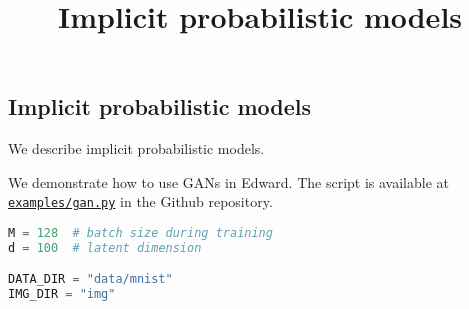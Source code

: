 \title{Implicit probabilistic models}

\subsection{Implicit probabilistic models}

We describe implicit probabilistic models.

We demonstrate how to use GANs in Edward.
The script is available at
\href{https://github.com/blei-lab/edward/blob/master/examples/gan.py}
{\texttt{examples/gan.py}} in the Github repository.

\begin{lstlisting}[language=Python]
M = 128  # batch size during training
d = 100  # latent dimension

DATA_DIR = "data/mnist"
IMG_DIR = "img"
\end{lstlisting}
